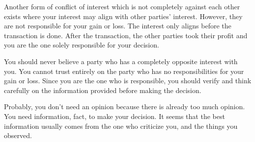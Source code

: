 \documentclass[a4paper]{report}
\begin{document}
Another form of conflict of interest which is not completely against each other exists where your interest may align with other parties' interest. However, they are not responsible for your gain or loss. The interest only aligns before the transaction is done. After the transaction, the other parties took their profit and you are the one solely responsible for your decision.

You should never believe a party who has a completely opposite interest with you. You cannot trust entirely on the party who has no responsibilities for your gain or loss. Since you are the one who is responsible, you should verify and think carefully on the information provided before making the decision.

Probably, you don't need an opinion because there is already too much opinion. You need information, fact, to make your decision. It seems that the best information usually comes from the one who criticize you, and the things you observed.
\end{document}
